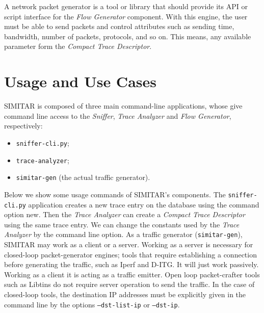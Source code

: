 A network packet generator is a tool or library that should provide its API or script interface for the \textit{Flow Generator} component. With this engine, the user must be able to send packets and control attributes such as sending time, bandwidth, number of packets, protocols, and so on. This means, any available parameter form the \textit{Compact Trace Descriptor}.


\section{Usage and Use Cases}


SIMITAR is composed of three main command-line applications, whose give command line access to the \textit{Sniffer}, \textit{Trace Analyzer} and \textit{Flow Generator}, respectively:
\begin{itemize}
\item \texttt{sniffer-cli.py};
\item \texttt{trace-analyzer};
\item \texttt{simitar-gen} (the actual traffic generator). 
\end{itemize}

Below we show some usage commands of SIMITAR’s components. The \texttt{sniffer-cli.py} application creates a new trace entry on the database using the command option new. Then the \textit{Trace Analyzer} can create a \textit{Compact Trace Descriptor} using the same trace entry. We can change the constants used by the \textit{Trace Analyzer} by the command line option. As a traffic generator (\texttt{simitar-gen}), SIMITAR may work as a client or a server. Working as a server is necessary for closed-loop packet-generator engines; tools that require establishing a connection before generating the traffic, such as Iperf and D-ITG. It will just work passively. Working as a client it is acting as a traffic emitter. Open loop packet-crafter tools such as Libtins do not require server operation to send the traffic. In the case of closed-loop tools, the destination IP addresses must be explicitly given in the command line by the options \texttt{--dst-list-ip} or \texttt{--dst-ip}.


